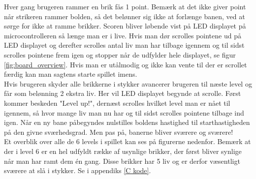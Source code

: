 Hver gang brugeren rammer en brik fås 1 point. Bemærk at det ikke giver point når strikeren rammer bolden, så det belønner sig ikke at forlænge banen, ved at sørge for ikke at ramme brikker. Scoren bliver løbende vist på LED displayet på microcontrolleren så længe man er i live. Hvis man dør scrolles pointene ud på LED displayet og derefter scrolles antal liv man har tilbage igennem og til sidst scrolles pointene frem igen og stopper når de udfylder hele displayet, se figur \ref{fig:board_overview}. Hvis man er utålmodig og ikke kan vente til der er scrollet færdig kan man sagtens starte spillet imens.\\

Hvis brugeren skyder alle brikkerne i stykker avancerer brugeren til næste level og får som belønning 2 ekstra liv. Her vil LED displayet begynde at scrolle. Først kommer beskeden "Level up!", dernæst scrolles hvilket level man er nået til igennem, så hvor mange liv man nu har og til sidst scrolles pointene tilbage ind igen. Når en ny bane påbegyndes nulstilles boldens hastighed til starthastigheden på den givne sværhedsgrad. Men pas på, banerne bliver sværere og sværere!\\

Et overblik over alle de 6 levels i spillet kan ses på figurerne nedenfor. Bemærk at der i level 6 er en hel udfyldt række af usynlige brikker, der først bliver synlige når man har ramt dem én gang. Disse brikker har 5 liv og er derfor væsentligt sværere at slå i stykker. Se  i appendiks \ref{C kode}. \\

